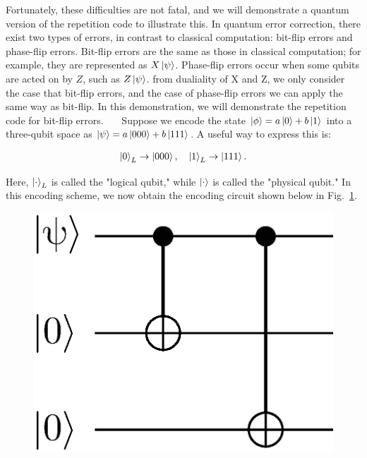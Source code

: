 \documentclass[a4paper,11pt]{ltjsarticle}
\begin{document}
{{{            Fortunately, these difficulties are not fatal, and we will demonstrate a quantum version of the repetition code to illustrate this. In quantum error correction, there exist two types of errors, in contrast to classical computation: bit-flip errors and phase-flip errors. Bit-flip errors are the same as those in classical computation; for example, they are represented as $X\ket{\psi}$. Phase-flip errors occur when some qubits are acted on by $Z$, such as $Z\ket{\psi}$. from dualiality of X and Z, we only consider the case that bit-flip errors, and the case of phase-flip errors we can apply the same way as bit-flip. In this demonstration, we will demonstrate the repetition code for bit-flip errors. 
            \ \ \ Suppose we encode the state \(\ket{\phi} = a\ket{0} + b\ket{1}\) into a three-qubit space as \(\ket{\psi} = a\ket{000} + b\ket{111}\). A useful way to express this is:

            \begin{align}
                    \ket{0}_L \rightarrow \ket{000},\ \ \ \ket{1}_L \rightarrow \ket{111}.
            \end{align}

            Here, \(\ket{\cdot}_L\) is called the "logical qubit," while \(\ket{\cdot}\) is called the "physical qubit." In this encoding scheme, we now obtain the encoding circuit shown below in Fig.~\ref{encoding_repetition}.

            \begin{figure}[h]
                \centering
                \includegraphics[scale=0.40]{figure/encoding_repetition.eps}
                \vspace{-40pt}\caption{}
                \label{encoding_repetition}
                \vspace{-15pt}
            \end{figure}

}}}
\end{document}
